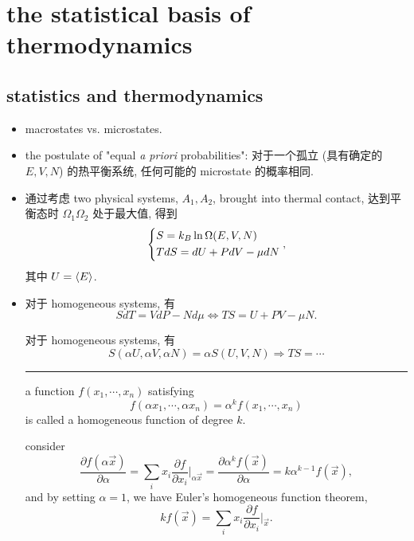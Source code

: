 \chapter{the statistical basis of thermodynamics}
\section{statistics and thermodynamics}
\begin{itemize}
	\item macrostates vs. microstates.
	
	\item the postulate of "equal \textit{a priori} probabilities": 对于一个孤立 (具有确定的 $E, V, N$) 的热平衡系统, 任何可能的 microstate 的概率相同.
	
	\item 通过考虑 two physical systems, $A_1, A_2$, brought into thermal contact, 达到平衡态时 $\Omega_1 \Omega_2$ 处于最大值, 得到
	\begin{equation}
		\begin{dcases}
			S = k_B \ln \Omega(E, V, N) \\
			T dS = dU + P dV - \mu dN
		\end{dcases},
	\end{equation}
	其中 $U = \braket{E}$.
	
	\item 对于 homogeneous systems, 有
	\begin{equation}
		S dT = V dP - N d\mu \iff T S = U + P V - \mu N.
	\end{equation}
	
	\begin{tcolorbox}[title=homogeneity relations:]
		对于 homogeneous systems, 有
		\begin{equation}
			S(\alpha U, \alpha V, \alpha N) = \alpha S(U, V, N) \Longrightarrow T S = \cdots
		\end{equation}
		
		\noindent\rule[0.5ex]{\linewidth}{0.5pt} %
		
		a function $f(x_1, \cdots, x_n)$ satisfying
		\begin{equation}
			f(\alpha x_1, \cdots, \alpha x_n) = \alpha^k f(x_1, \cdots, x_n)
		\end{equation}
		is called a homogeneous function of degree $k$.
		
		consider
		\begin{equation}
			\frac{\partial f(\alpha \vec{x})}{\partial \alpha} = \sum_i x_i \frac{\partial f}{\partial x_i} \Big|_{\alpha \vec{x}} = \frac{\partial \alpha^k f(\vec{x})}{\partial \alpha} = k \alpha^{k - 1} f(\vec{x}),
		\end{equation}
		and by setting $\alpha = 1$, we have Euler's homogeneous function theorem,
		\begin{equation}
			k f(\vec{x}) = \sum_i x_i \frac{\partial f}{\partial x_i} \Big|_{\vec{x}}.
		\end{equation}
	\end{tcolorbox}
	

\end{itemize}
